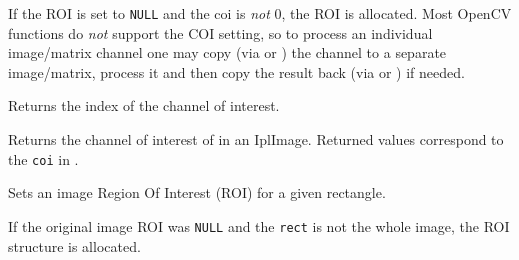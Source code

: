 
\begin{description}
\end{description}

If the ROI is set to \texttt{NULL} and the coi is \textit{not} 0,
the ROI is allocated. Most OpenCV functions do \textit{not} support
the COI setting, so to process an individual image/matrix channel one
may copy (via  or ) the channel to a separate
image/matrix, process it and then copy the result back (via 
or ) if needed.

\label{GetImageCOI}

Returns the index of the channel of interest. 


\begin{description}
\end{description}

Returns the channel of interest of in an IplImage. Returned values correspond to the \texttt{coi} in .

\label{SetImageROI}\label{ROI}

Sets an image Region Of Interest (ROI) for a given rectangle.


\begin{description}
\end{description}

If the original image ROI was \texttt{NULL} and the \texttt{rect} is not the whole image, the ROI structure is allocated.

